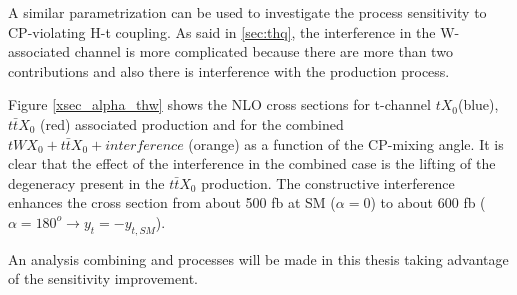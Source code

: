 A similar parametrization can be used to investigate the \tHW process sensitivity to CP-violating H-t coupling. As said in \ref{sec:thq}, the interference in the W-associated channel is more complicated because there are more than two contributions and also there is interference with the \ttH production process.

Figure \ref{xsec_alpha_thw} shows the NLO cross sections for t-channel $tX_0$(blue), $t\bar{t}X_0$ (red) associated production and for the combined  $tWX_0 + t\bar{t}X_0 + interference$ (orange) as a function of the CP-mixing angle. It is clear that the effect of the interference in the combined case is the lifting of the degeneracy present in the $t\bar{t}X_0$ production. The constructive interference enhances the cross section from about 500 fb at SM ($\alpha=0$) to about 600 fb ($\alpha=180^o \to y_t=-y_{t,SM}$).  

An analysis combining \tHq and \tHW processes will be made in this thesis taking advantage of the sensitivity improvement.

